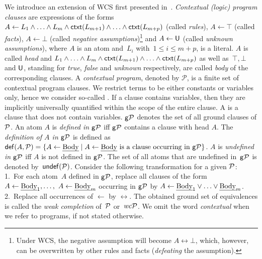 \documentclass[12pt]{article}
\begin{document}
We introduce an extension of WCS first presented in~\cite{dietz:hoelldobler:pereira:2017}. 
\textit{Contextual (logic) program clauses}
are expressions of the forms $A  \leftarrow  L_1 \land \ldots \land L_m \land
\mathsf{ctxt}(L_{m+1}) \land \ldots \land \mathsf{ctxt}(L_{m+p})$ (called
\textit{rules}), $A \leftarrow \top$ (called \textit{facts}), $A \leftarrow \bot$ (called
\textit{negative assumptions})\footnote{Under WCS, the negative
assumption will become $A \leftrightarrow \bot$, which, however, can be overwritten by other rules and facts (\textit{defeating} the assumption).} and $A \leftarrow \mathsf{U}$ (called
\textit{unknown assumptions}), where
$A$ is an atom and~$L_i$ with~$1 \leq i \leq m+p$, is a literal.
$A$ is called \textit{head}
and $L_1 \land \ldots \land L_m \land
\mathsf{ctxt}(L_{m+1}) \land \ldots \land \mathsf{ctxt}(L_{m+p})$ as well as~$\top, \bot$
and $\mathsf{U}$,
standing for \textit{true}, \textit{false} and \textit{unknown} respectively, are
called \textit{body} of the corresponding clauses.  A
\textit{contextual program}, denoted by $\mathcal P$,
is a finite set of contextual program clauses.
We restrict terms to be either constants or variables only, hence we consider so-called .
If a clause contains variables, then they are implicitly universally quantified within the scope of the entire clause. 
A  is a clause that does not contain variables.
$\mathsf{g} {\cal P}$ denotes the set of all ground clauses of ${\cal P}$.
An atom $A$ is \textit{defined in $\mathsf{g} {\cal P}$}  iff $\mathsf{g} {\cal P}$ contains a clause with head $A$.
The \textit{definition of $A$ in $\mathsf{g} {\cal P}$} is defined as $\mathsf{def}(A,{\cal P})
= \{ A \leftarrow \mbox{\em Body} \mid A \leftarrow \mbox{\em Body} \mbox{ is a clause
occurring in } \mathsf{g} {\cal P}\}$.
$A$ is \textit{undefined in $\mathsf{g} {\cal P}$} iff $A$ is not defined in $\mathsf{g} {\cal P}$.
The set of all atoms that are undefined in~$\mathsf{g} {\cal P}$ is denoted by~$\mathsf{undef}({\cal P})$.
Consider the following transformation for a given ${\cal P}$:
1.\ For each atom~$A$ defined in $\mathsf{g} {\cal P}$, replace
  all clauses of the form $A \leftarrow \mbox{\em Body}_1, \ldots,$ $A \leftarrow
  \mbox{\em Body}_m$ occurring in $\mathsf{g} {\cal P}$ by $ A \leftarrow \mbox{\em Body}_1 \vee
  \ldots \vee \mbox{\em Body}_m$. 2.\ Replace all occurrences of $\leftarrow$ by $\leftrightarrow$.
The obtained ground set of equivalences is called the \textit{weak completion}
of~${\cal P}$ or~$\mathit{wc}{\cal P}$.
We omit the word \textit{contextual} when we refer to programs, if not stated otherwise.
\end{document}
